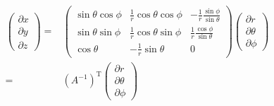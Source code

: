 \documentclass{jsarticle}
\newcommand{\mr}[1]{\mathrm{#1}}
\begin{document}
\begin{align*}
\left(
\begin{array}{c}
\partial x\\
\partial y\\
\partial z
\end{array}
\right)
= &
\left(
\begin{array}{rrr}
\sin \theta \cos \phi & \frac{1}{r} \cos \theta \cos \phi & - \frac{1}{r} \frac{\sin \phi}{\sin \theta} \\[4pt]
\sin \theta \sin \phi & \frac{1}{r} \cos \theta \sin \phi & \frac{1}{r} \frac{\cos \phi }{\sin \theta}\\[4pt]
\cos \theta & - \frac{1}{r} \sin \theta & 0
\end{array}
\right)
\left(
\begin{array}{c}
\partial r\\
\partial \theta\\
\partial \phi
\end{array}
\right)\\
= & 
(A^{-1})^\mr{T}
\left(
\begin{array}{c}
\partial r\\
\partial \theta\\
\partial \phi
\end{array}
\right)
\end{align*}
\end{document}
